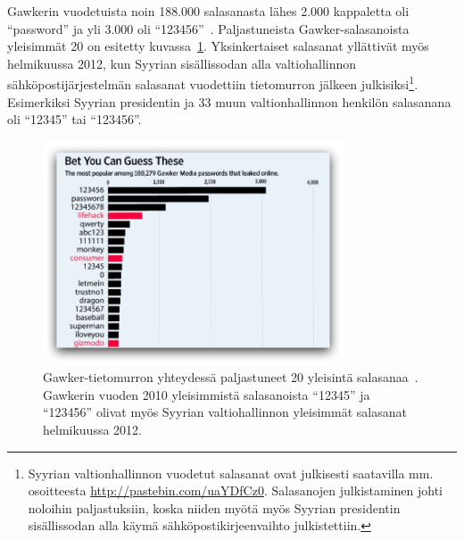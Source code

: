 \documentclass[finnish,gradu]{tktltiki}
\begin{document}
   Gawkerin vuodetuista noin 188.000 salasanasta lähes 2.000 kappaletta oli ``password'' ja yli 3.000 oli  ``123456''~\cite{forbes_gawker_12_2010}. Paljastuneista Gawker-salasanoista yleisimmät 20 on esitetty kuvassa~\ref{fig:gawker_top20_passwords}. Yksinkertaiset salasanat yllättivät myös helmikuussa 2012, kun Syyrian sisällissodan alla valtiohallinnon sähköpostijärjestelmän salasanat vuodettiin tietomurron jälkeen julkisiksi\footnote{Syyrian valtionhallinnon vuodetut salasanat ovat julkisesti saatavilla mm. osoitteesta \url{http://pastebin.com/uaYDfCz0}. Salasanojen julkistaminen johti noloihin paljastuksiin, koska niiden myötä myös Syyrian presidentin sisällissodan alla käymä sähköpostikirjeenvaihto julkistettiin.}. Esimerkiksi Syyrian presidentin ja 33 muun valtionhallinnon henkilön salasanana oli ``12345'' tai ``123456''.

  \begin{figure}
    \centering
    \includegraphics[width=0.8\textwidth]{images/gawker_top20_passwords.jpg}
    \caption[Gawker-tietomurrossa paljastuneet 20 yleisintä salasanaa.]{Gawker-tietomurron yhteydessä paljastuneet 20 yleisintä salasanaa~\cite{wsj_gawker_12_2010}. Gawkerin vuoden 2010 yleisimmistä salasanoista ``12345'' ja ``123456'' olivat myös Syyrian valtiohallinnon yleisimmät salasanat helmikuussa 2012.}
    \label{fig:gawker_top20_passwords}
  \end{figure}
\end{document}
